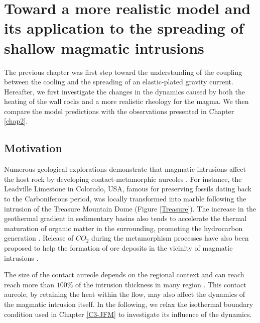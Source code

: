 
\chapter{Toward  a more  realistic model  and its  application to  the
  spreading of shallow magmatic intrusions}
\label{Heating}

\minitoc

The previous  chapter was first  step toward the understanding  of the
coupling between  the cooling and  the spreading of  an elastic-plated
gravity current.  Hereafter,  we first investigate the  changes in the
dynamics  caused by  both the  heating of  the wall  rocks and  a more
realistic  rheology  for   the  magma.  We  then   compare  the  model
predictions with the observations presented in Chapter \ref{chap2}.


\section{Motivation}
\label{sec:introduction}

Numerous geological explorations  demonstrate that magmatic intrusions
affect  the  host  rock  by  developing  contact-metamorphic  aureoles
\citep{Jaeger:1959du,Galushkin:1997dy,Senger:2014tt}.   For  instance,
the  Leadville  Limestone  in  Colorado, USA,  famous  for  preserving
fossils  dating   back  to  the  Carboniferous   period,  was  locally
transformed  into  marble  following  the intrusion  of  the  Treasure
Mountain Dome (Figure \ref{Treasure}).  The increase in the geothermal
gradient in  sedimentary basins also  tends to accelerate  the thermal
maturation  of  organic  matter  in  the  surrounding,  promoting  the
hydrocarbon generation \citep{Senger:2014tt}. Release of $CO_2$ during
the  metamorphism  processes  have  also been  proposed  to  help  the
formation  of ore  deposits  in the  vicinity  of magmatic  intrusions
\citep{SILLITOE:1998bs,Ganino:2008ft,Zhou:2008hc}.

The size  of the contact aureole  depends on the regional  context and
can reach reach  more than $100\%$ of the intrusion  thickness in many
region \citep{Galushkin:1997dy}.   This contact aureole,  by retaining
the heat within the flow, may also affect the dynamics of the magmatic
intrusion itself.  In the following,  we relax the isothermal boundary
condition used in Chapter \ref{C3-JFM} to investigate its influence of
the dynamics.

